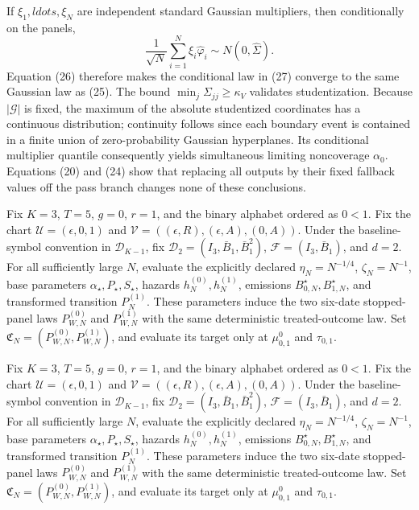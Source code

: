If \(\xi_1,ldots,\xi_N\) are independent standard Gaussian multipliers, then conditionally on the panels,
\[
 \frac1{\sqrt N}\sum_{i=1}^N\xi_i\widehat\varphi_i
 \sim N(0,\widehat\Sigma).                                   \tag{27}
\]
Equation (26) therefore makes the conditional law in (27) converge to the same Gaussian law as (25).  The bound \(\min_j\Sigma_{jj}\ge\kappa_V\) validates studentization.  Because \(|\mathcal G|\) is fixed, the maximum of the absolute studentized coordinates has a continuous distribution; continuity follows since each boundary event is contained in a finite union of zero-probability Gaussian hyperplanes.  Its conditional multiplier quantile consequently yields simultaneous limiting noncoverage \(\alpha_0\).  Equations (20) and (24) show that replacing all outputs by their fixed fallback values off the pass branch changes none of these conclusions.

Fix \(K=3\), \(T=5\), \(g=0\), \(r=1\), and the binary alphabet ordered as \(0<1\).  Fix the chart \(\mathcal U=(\epsilon,0,1)\) and \(\mathcal V=((\epsilon,R),(\epsilon,A),(0,A))\).  Under the baseline-symbol convention in \(\mathcal D_{K-1}\), fix \(\mathcal D_2=(I_3,\bar B_1,\bar B_1^2)\), \(\mathcal F=(I_3,\bar B_1)\), and \(d=2\).  For all sufficiently large \(N\), evaluate the explicitly declared \(\eta_N=N^{-1/4}\), \(\zeta_N=N^{-1}\), base parameters \(\alpha_{\star},P_{\star},S_{\star}\), hazards \(h_N^{(0)},h_N^{(1)}\), emissions \(B_{0,N}^{\star},B_{1,N}^{\star}\), and transformed transition \(P_N^{(1)}\).  These parameters induce the two six-date stopped-panel laws \(P_{W,N}^{(0)}\) and \(P_{W,N}^{(1)}\) with the same deterministic treated-outcome law.  Set \(\mathfrak C_N=(P_{W,N}^{(0)},P_{W,N}^{(1)})\), and evaluate its target only at \(\mu^0_{0,1}\) and \(\tau_{0,1}\).

Fix \(K=3\), \(T=5\), \(g=0\), \(r=1\), and the binary alphabet ordered as \(0<1\).  Fix the chart \(\mathcal U=(\epsilon,0,1)\) and \(\mathcal V=((\epsilon,R),(\epsilon,A),(0,A))\).  Under the baseline-symbol convention in \(\mathcal D_{K-1}\), fix \(\mathcal D_2=(I_3,\bar B_1,\bar B_1^2)\), \(\mathcal F=(I_3,\bar B_1)\), and \(d=2\).  For all sufficiently large \(N\), evaluate the explicitly declared \(\eta_N=N^{-1/4}\), \(\zeta_N=N^{-1}\), base parameters \(\alpha_{\star},P_{\star},S_{\star}\), hazards \(h_N^{(0)},h_N^{(1)}\), emissions \(B_{0,N}^{\star},B_{1,N}^{\star}\), and transformed transition \(P_N^{(1)}\).  These parameters induce the two six-date stopped-panel laws \(P_{W,N}^{(0)}\) and \(P_{W,N}^{(1)}\) with the same deterministic treated-outcome law.  Set \(\mathfrak C_N=(P_{W,N}^{(0)},P_{W,N}^{(1)})\), and evaluate its target only at \(\mu^0_{0,1}\) and \(\tau_{0,1}\).

